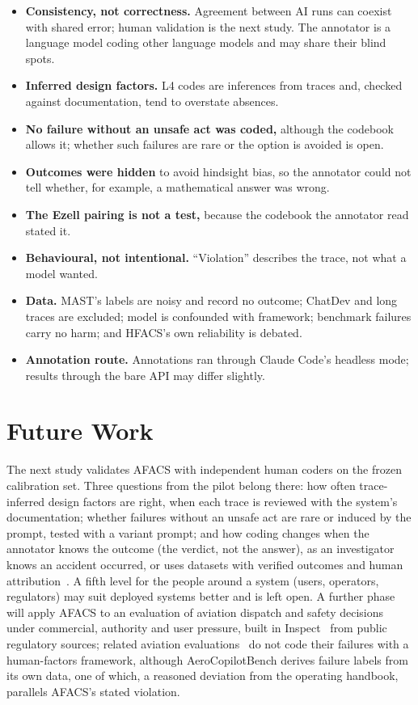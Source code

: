\documentclass[11pt]{article}
\begin{document}
\begin{itemize}\setlength{\itemsep}{1pt}
  \item \textbf{Consistency, not correctness.} Agreement between AI runs can
  coexist with shared error; human validation is the next study. The annotator is
  a language model coding other language models and may share their blind spots.
  \item \textbf{Inferred design factors.} L4 codes are inferences from traces and,
  checked against documentation, tend to overstate absences.
  \item \textbf{No failure without an unsafe act was coded,} although the codebook
  allows it; whether such failures are rare or the option is avoided is open.
  \item \textbf{Outcomes were hidden} to avoid hindsight bias, so the annotator
  could not tell whether, for example, a mathematical answer was wrong.
  \item \textbf{The Ezell pairing is not a test,} because the codebook the
  annotator read stated it.
  \item \textbf{Behavioural, not intentional.} ``Violation'' describes the trace,
  not what a model wanted.
  \item \textbf{Data.} MAST's labels are noisy and record no outcome; ChatDev and
  long traces are excluded; model is confounded with framework; benchmark failures
  carry no harm; and HFACS's own reliability is debated.
  \item \textbf{Annotation route.} Annotations ran through Claude Code's headless
  mode; results through the bare API may differ slightly.
\end{itemize}

\section{Future Work}

The next study validates AFACS with independent human coders on the frozen
calibration set. Three questions from the pilot belong there: how often
trace-inferred design factors are right, when each trace is reviewed with the
system's documentation; whether failures without an unsafe act are rare or induced
by the prompt, tested with a variant prompt; and how coding changes when the
annotator knows the outcome (the verdict, not the answer), as an investigator knows
an accident occurred, or uses datasets with verified outcomes and human
attribution~\cite{zhang2025whowhen}. A fifth level for the people around a system
(users, operators, regulators) may suit deployed systems better and is left open.
A further phase will apply AFACS to an evaluation of aviation dispatch and safety
decisions under commercial, authority and user pressure, built in
Inspect~\cite{aisi2024inspect} from public regulatory sources; related aviation
evaluations~\cite{brooker2026preflight,wu2026pilotbench,yuan2026aerocopilotbench}
do not code their failures with a human-factors framework, although AeroCopilotBench
derives failure labels from its own data, one of which, a reasoned deviation from
the operating handbook, parallels AFACS's stated violation.
\end{document}
